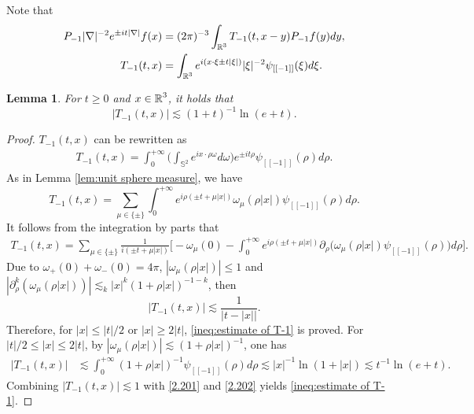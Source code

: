 \documentclass[11pt,twoside]{article}
\def\R{\mathop{\mathbb R\kern 0pt}\nolimits}
\def\f{\frac}
\def\p{\partial}
\def\ls{\lesssim}
\theoremstyle{plain}
\newtheorem{lemma}[theorem]{Lemma}
\theoremstyle{definition}
\numberwithin{equation}{section}
\begin{document}
	Note that
	\begin{equation}\label{def:T-1}
		\begin{split}
			P_{-1}|\nabla|^{-2}e^{\pm it|\nabla|}f(x)&=(2\pi)^{-3}\int_{\R^3}T_{-1}(t,x-y)P_{-1}f(y)dy,\\
			T_{-1}(t,x)&=\int_{\R^3}e^{i(x\cdot\xi\pm t|\xi|)}|\xi|^{-2}\psi_{[[-1]]}(\xi)d\xi.
		\end{split}
	\end{equation}
	\begin{lemma}\label{lem:estimate of T-1}
		For $t\ge 0$ and $x\in\R^3$, it holds that
		\begin{equation}\label{ineq:estimate of T-1}
			|T_{-1}(t,x)|\ls (1+t)^{-1}\ln(e+t).
		\end{equation}
	\end{lemma}
	\begin{proof}
		$T_{-1}(t,x)$ can be rewritten as
		\begin{equation*}
			\begin{split}
				T_{-1}(t,x)=\int_{0}^{+\infty}\big(\int_{\mathbb{S}^{2}}e^{ix\cdot\rho\omega}d\omega\big)e^{\pm it\rho}\psi_{[[-1]]}(\rho) d\rho.
			\end{split}
		\end{equation*}
		As in Lemma \ref{lem:unit sphere measure}, we have
		\begin{equation*}
			T_{-1}(t,x)=\sum_{\mu\in\{\pm\}}\int_{0}^{+\infty}e^{i\rho(\pm t+\mu|x|)}\omega_{\mu}(\rho|x|)\psi_{[[-1]]}(\rho)  d\rho.
		\end{equation*}
		It follows from the integration by parts that
		\begin{equation*}
			\begin{split}
				T_{-1}(t,x)=\sum_{\mu\in\{\pm\}}\f{1}{i(\pm t+\mu|x|)}\big[-\omega_{\mu}(0)-
				\int_{0}^{+\infty}e^{i\rho(\pm t+\mu|x|)}\p_\rho\big(\omega_{\mu}(\rho|x|)\psi_{[[-1]]}(\rho)\big)d\rho\big].
			\end{split}
		\end{equation*}
		Due to $\omega_{+}(0)+\omega_{-}(0)=4\pi$, $|\omega_{\mu}(\rho |x|)|\le 1$ and $|\p_\rho^k(\omega_{\mu}(\rho |x|))|\ls_k|x|^k(1+\rho|x|)^{-1-k}$, then
		\begin{equation}\label{2.201}
			|T_{-1}(t,x)|\ls\f{1}{|t-|x||}.
		\end{equation}
		Therefore, for $|x|\le |t|/2$ or $|x|\ge 2|t|$, \eqref{ineq:estimate of T-1} is proved.
		For $|t|/2\le |x|\le 2|t|$, by $|\omega_{\mu}(\rho |x|)|\ls(1+\rho|x|)^{-1}$, one has
		\begin{equation}\label{2.202}
			\begin{split}
				|T_{-1}(t,x)|&\ls\int_{0}^{+\infty}  (1+\rho|x|)^{-1}\psi_{[[-1]]}(\rho)   d\rho\ls |x|^{-1}\ln(1+|x|)\ls t^{-1}\ln(e+t).
			\end{split}
		\end{equation}
		Combining $|T_{-1}(t,x)|\ls1$ with \eqref{2.201} and \eqref{2.202} yields \eqref{ineq:estimate of T-1}.
	\end{proof}
\end{document}
